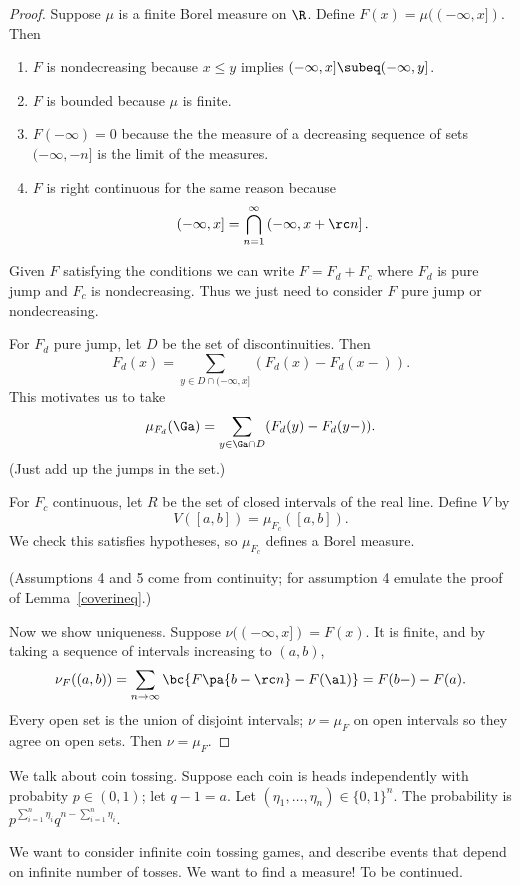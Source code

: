 \begin{proof}
Suppose $\mu$ is a finite Borel measure on $\R$. Define $F(x)=\mu((-\infty,x])$. Then 
\begin{enumerate}
\item
$F$ is nondecreasing because $x\leq y$ implies $(-\infty,x]\subeq (-\infty, y]$.
\item
$F$ is bounded because $\mu$ is finite.
\item
$F(-\infty)=0$ because the the measure of a decreasing sequence of sets $(-\infty, -n]$ is the limit of the measures. 
\item
$F$ is right continuous for the same reason because
\[
(-\infty,x]=\bigcap_{n=1}^{\infty} \left(-\infty, x+\rc n\right].
\]
\end{enumerate}
Given $F$ satisfying the conditions we can write $F=F_d+F_c$ where $F_d$ is pure jump and $F_c$ is nondecreasing. Thus we just need to consider $F$ pure jump or nondecreasing.

For $F_d$ pure jump, let $D$ be the set of discontinuities. Then
\[
F_d(x)=\sum_{y\in D\cap (-\infty, x]} (F_{d}(x)-F_d(x-)).
\]
This motivates us to take
\[
\mu_{F_{d}}(\Ga)=\sum_{y\in \Ga\cap D}(F_d(y)-F_d(y-)).
\]
(Just add up the jumps in the set.)

For $F_c$ continuous, let $R$ be the set of closed intervals of the real line. Define $V$ by
\[
V([a,b])=\mu_{F_c}([a,b]).
\]
We check this satisfies hypotheses, so $\mu_{F_c}$ defines a Borel measure.

(Assumptions 4 and 5 come from continuity; for assumption 4 %
emulate the proof of Lemma~\ref{coverineq}.)

Now we show uniqueness. Suppose $\nu((-\infty, x])=F(x)$.
It is finite, and by taking a sequence of intervals increasing to $(a,b)$,
\[\nu_F((a,b))=\sum_{n\to \infty}\bc{F\pa{b-\rc n}-F(\al)}=F(b-)-F(a).\]
%
Every open set is the union of disjoint intervals; $\nu=\mu_F$ on open intervals so they agree on open sets.
Then $\nu=\mu_F$.
\end{proof}

We talk about coin tossing. Suppose each coin is heads independently with probabity $p\in (0,1)$; let $q-1=a$. Let $(\eta_1,\ldots, \eta_n)\in \{0,1\}^n$. %
The probability  is $p^{\sum_{i=1}^n\eta_i}q^{n-\sum_{i=1}^n \eta_i}$.

We want to consider infinite coin tossing games, and describe events that depend on infinite number of tosses. We want to find a measure!
To be continued.
